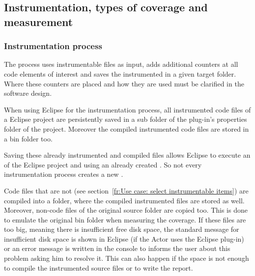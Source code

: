 \subsection{Instrumentation, types of coverage and measurement} \label{fr:Instrumentation, types of coverage and measurement}
\subsubsection{Instrumentation process} \label{fr:Instrumentation process}
The  process uses instrumentable files as input, adds additional counters at all code elements of interest and saves the instrumented  in a given target folder. Where these counters are placed and how they are used must be clarified in the software design.
\par
When using Eclipse for the instrumentation process, all instrumented code files of a Eclipse project are persistently saved in a sub folder of the plug-in's properties folder of the project. Moreover the compiled instrumented code files are stored in a bin folder too.
\par
Saving these already instrumented and compiled files allows Eclipse to execute an  of the Eclipse project and using an already created . So not every instrumentation process creates a new .
\par
Code files that are not  (see section~\ref{fr:Use case: select instrumentable items}) are compiled into a folder, where the compiled instrumented files are stored as well. Moreover, non-code files of the original source folder are copied too. This is done to emulate the original bin folder when measuring the coverage. If these files are too big, meaning there is insufficient free disk space, the standard message for insufficient disk space is shown in Eclipse (if the Actor uses the Eclipse plug-in) or an error message is written in the console to informs the user about this problem asking him to resolve it. This can also happen if the space is not enough to compile the instrumented source files or to write the report.

